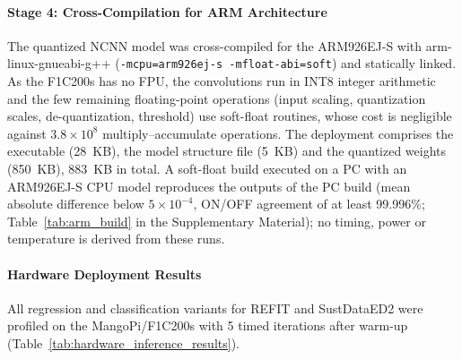 \documentclass[fleqn,10pt]{wlscirep}
\begin{document}
\paragraph{Stage 4: Cross-Compilation for ARM Architecture}
The quantized NCNN model was cross-compiled for the ARM926EJ-S with arm-linux-gnueabi-g++ (\texttt{-mcpu=arm926ej-s -mfloat-abi=soft}) and statically linked. As the F1C200s has no FPU, the convolutions run in INT8 integer arithmetic and the few remaining floating-point operations (input scaling, quantization scales, de-quantization, threshold) use soft-float routines, whose cost is negligible against $3.8\times10^{8}$ multiply--accumulate operations. The deployment comprises the executable (28~KB), the model structure file (5~KB) and the quantized weights (850~KB), 883~KB in total. A soft-float build executed on a PC with an ARM926EJ-S CPU model reproduces the outputs of the PC build (mean absolute difference below $5\times10^{-4}$, ON/OFF agreement of at least 99.996\%; Table~\ref{tab:arm_build} in the Supplementary Material); no timing, power or temperature is derived from these runs.

\paragraph{Hardware Deployment Results}
All regression and classification variants for REFIT and SustDataED2 were profiled on the MangoPi/F1C200s with 5 timed iterations after warm-up (Table~\ref{tab:hardware_inference_results}).
\end{document}
